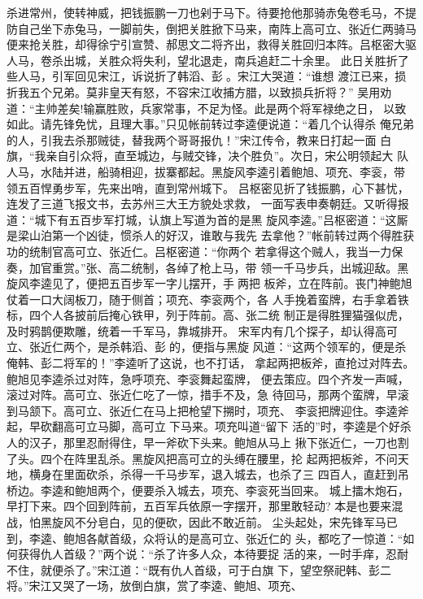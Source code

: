 杀进常州，使转神威，把钱振鹏一刀也剁于马下。待要抢他那骑赤兔卷毛马，不提
防自己坐下赤兔马，一脚前失，倒把关胜掀下马来，南阵上高可立、张近仁两骑马
便来抢关胜，却得徐宁引宣赞、郝思文二将齐出，救得关胜回归本阵。吕枢密大驱
人马，卷杀出城，关胜众将失利，望北退走，南兵追赶二十余里。
此日关胜折了些人马，引军回见宋江，诉说折了韩滔、彭。宋江大哭道：“谁想
渡江已来，损折我五个兄弟。莫非皇天有怒，不容宋江收捕方腊，以致损兵折将？”
吴用劝道：“主帅差矣!输赢胜败，兵家常事，不足为怪。此是两个将军禄绝之日，
以致如此。请先锋免忧，且理大事。”只见帐前转过李逵便说道：“着几个认得杀
俺兄弟的人，引我去杀那贼徒，替我两个哥哥报仇！”宋江传令，教来日打起一面
白旗，“我亲自引众将，直至城边，与贼交锋，决个胜负”。次日，宋公明领起大
队人马，水陆并进，船骑相迎，拔寨都起。黑旋风李逵引着鲍旭、项充、李衮，带
领五百悍勇步军，先来出哨，直到常州城下。
吕枢密见折了钱振鹏，心下甚忧，连发了三道飞报文书，去苏州三大王方貌处求救，
一面写表申奏朝廷。又听得报道：“城下有五百步军打城，认旗上写道为首的是黑
旋风李逵。”吕枢密道：“这厮是梁山泊第一个凶徒，惯杀人的好汉，谁敢与我先
去拿他？”帐前转过两个得胜获功的统制官高可立、张近仁。吕枢密道：“你两个
若拿得这个贼人，我当一力保奏，加官重赏。”张、高二统制，各绰了枪上马，带
领一千马步兵，出城迎敌。黑旋风李逵见了，便把五百步军一字儿摆开，手两把
板斧，立在阵前。丧门神鲍旭仗着一口大阔板刀，随于侧首；项充、李衮两个，各
人手挽着蛮牌，右手拿着铁标，四个人各披前后掩心铁甲，列于阵前。高、张二统
制正是得胜狸猫强似虎，及时鸦鹊便欺雕，统着一千军马，靠城排开。
宋军内有几个探子，却认得高可立、张近仁两个，是杀韩滔、彭的，便指与黑旋
风道：“这两个领军的，便是杀俺韩、彭二将军的！”李逵听了这说，也不打话，
拿起两把板斧，直抢过对阵去。鲍旭见李逵杀过对阵，急呼项充、李衮舞起蛮牌，
便去策应。四个齐发一声喊，滚过对阵。高可立、张近仁吃了一惊，措手不及，急
待回马，那两个蛮牌，早滚到马颔下。高可立、张近仁在马上把枪望下搠时，项充、
李衮把牌迎住。李逵斧起，早砍翻高可立马脚，高可立下马来。项充叫道“留下
活的”时，李逵是个好杀人的汉子，那里忍耐得住，早一斧砍下头来。鲍旭从马上
揪下张近仁，一刀也割了头。四个在阵里乱杀。黑旋风把高可立的头缚在腰里，抡
起两把板斧，不问天地，横身在里面砍杀，杀得一千马步军，退入城去，也杀了三
四百人，直赶到吊桥边。李逵和鲍旭两个，便要杀入城去，项充、李衮死当回来。
城上擂木炮石，早打下来。四个回到阵前，五百军兵依原一字摆开，那里敢轻动?
本是也要来混战，怕黑旋风不分皂白，见的便砍，因此不敢近前。
尘头起处，宋先锋军马已到，李逵、鲍旭各献首级，众将认的是高可立、张近仁的
头，都吃了一惊道：“如何获得仇人首级？”两个说：“杀了许多人众，本待要捉
活的来，一时手痒，忍耐不住，就便杀了。”宋江道：“既有仇人首级，可于白旗
下，望空祭祀韩、彭二将。”宋江又哭了一场，放倒白旗，赏了李逵、鲍旭、项充、
